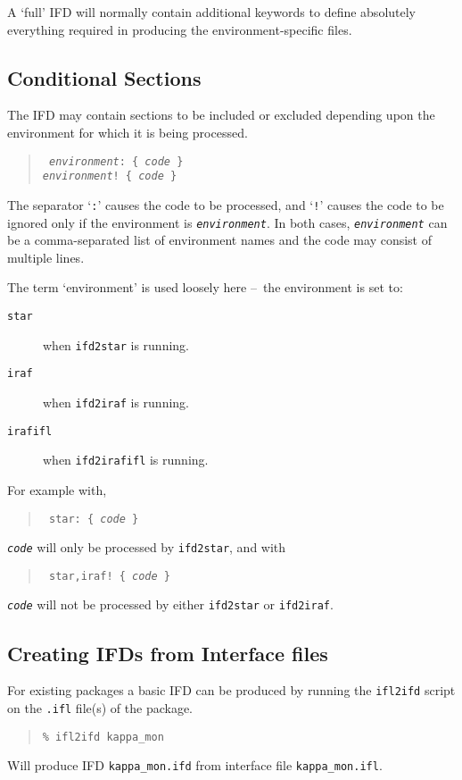 \documentclass[twoside,11pt]{article}
\newcommand{\htmlref}[2]{#1}
\newcommand{\xlabel}[1]{}
\newcommand{\dash}{--}
\newcommand{\dash}{-}
\begin{document}
A `full' IFD will normally contain additional keywords to define absolutely
everything required in producing the environment-specific files.

\subsection{\xlabel{conditional_sections}\label{conditional_sections}Conditional
Sections}
The IFD may contain sections to be included or excluded depending upon the
environment for which it is being processed.
\begin{quote} {\tt
\textit{environment}: \{ \textit{code} \}\\
\textit{environment}! \{ \textit{code} \}
} \end{quote}
The separator `\texttt{:}' causes the code to be processed, and `\texttt{!}'
causes the code to be ignored only if the environment is
\texttt{\textit{environment}}.
In both cases, \texttt{\textit{environment}} can be a comma-separated list of
environment names and the code may consist of multiple lines.

The term `environment' is used loosely here \dash\ the environment is set to:
\begin{description}
\item[\texttt{star}] when \htmlref{\texttt{ifd2star}}{ifd2star} is running.
\item[\texttt{iraf}] when \htmlref{\texttt{ifd2iraf}}{ifd2iraf} is running.
\item[\texttt{irafifl}] when \htmlref{\texttt{ifd2irafifl}}{ifd2irafifl} is
running.
\end{description}

For example with,
\begin{quote} {\tt
star: \{ \textit{code} \}
} \end{quote}
\texttt{\textit{code}} will only be processed by \texttt{ifd2star}, and with
\begin{quote} {\tt
star,iraf! \{ \textit{code} \}
} \end{quote}
\texttt{\textit{code}} will not be processed by either \texttt{ifd2star} or
\texttt{ifd2iraf}.

\subsection{\xlabel{creating_ifds_from_interface_files}Creating IFDs from
Interface files}
For existing packages a basic IFD can be produced by running the
\texttt{ifl2ifd} script on the \texttt{.ifl} file(s) of the package.
\begin{quote} \begin{verbatim}
% ifl2ifd kappa_mon
\end{verbatim} \end{quote}
Will produce IFD \texttt{kappa\_mon.ifd} from interface file
\texttt{kappa\_mon.ifl}.
\end{document}
